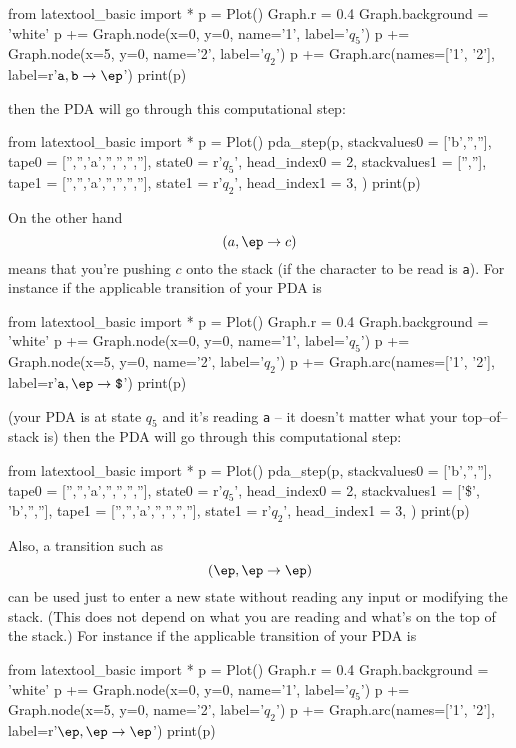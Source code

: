 \begin{python}
from latextool_basic import *
p = Plot()
Graph.r = 0.4
Graph.background = 'white'
p += Graph.node(x=0, y=0, name='1', label='$q_5$')
p += Graph.node(x=5, y=0, name='2', label='$q_2$')
p += Graph.arc(names=['1', '2'], label=r'$\texttt{a}, \texttt{b} \rightarrow \texttt{$\ep$} $')
print(p)
\end{python}

then the PDA will go through this computational step:

\begin{python}
from latextool_basic import *
p = Plot()
pda_step(p,
         stackvalues0 = ['b','',''],
         tape0 = ['','','a','','','',''],
         state0 = r'$q_5$',
         head_index0 = 2,
         stackvalues1 = ['',''],
         tape1 = ['','','a','','','',''],
         state1 = r'$q_2$',
         head_index1 = 3,
        )        
print(p)
\end{python}



On the other hand
\[
(a, \ep \rightarrow c)
\]
means that
you're pushing $c$ onto the stack
(if the character to be read is \verb!a!).
For instance if the applicable transition of your PDA is
\begin{python}
from latextool_basic import *
p = Plot()
Graph.r = 0.4
Graph.background = 'white'
p += Graph.node(x=0, y=0, name='1', label='$q_5$')
p += Graph.node(x=5, y=0, name='2', label='$q_2$')
p += Graph.arc(names=['1', '2'], label=r'$\texttt{a}, \texttt{$\ep$} \rightarrow \texttt{\$} $')
print(p)
\end{python}

(your PDA is at state $q_5$ and it's reading \verb!a! --
it doesn't matter what your top--of--stack is)
then the PDA will go through this computational step:

\begin{python}
from latextool_basic import *
p = Plot()
pda_step(p,
         stackvalues0 = ['b','',''],
         tape0 = ['','','a','','','',''],
         state0 = r'$q_5$',
         head_index0 = 2,
         stackvalues1 = ['\$', 'b','',''],
         tape1 = ['','','a','','','',''],
         state1 = r'$q_2$',
         head_index1 = 3,
        )        
print(p)
\end{python}






Also, a transition such as
\[
(\ep, \ep\rightarrow \ep)
\]
can be used just to enter a new state without reading any input
or modifying the stack.
(This does not depend on what you are reading and what's on the
top of the stack.)
For instance if the applicable transition of your PDA is
\begin{python}
from latextool_basic import *
p = Plot()
Graph.r = 0.4
Graph.background = 'white'
p += Graph.node(x=0, y=0, name='1', label='$q_5$')
p += Graph.node(x=5, y=0, name='2', label='$q_2$')
p += Graph.arc(names=['1', '2'], label=r'$\ep, \ep \rightarrow \ep $')
print(p)
\end{python}

